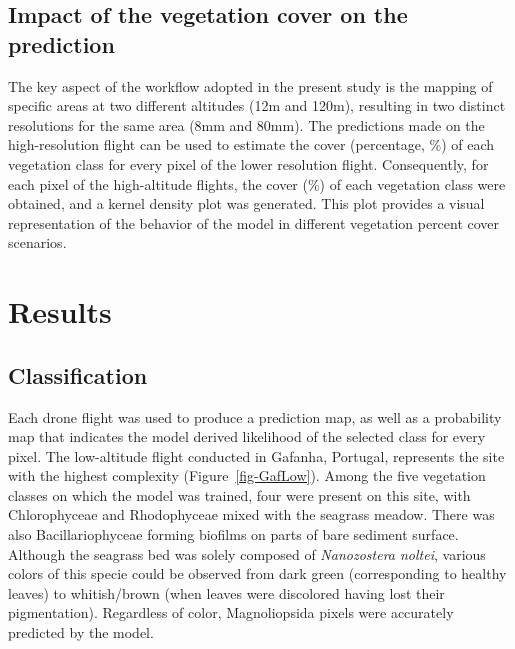 \documentclass[
  number]{elsarticle}
\begin{document}
\subsection{Impact of the vegetation cover on the
prediction}\label{impact-of-the-vegetation-cover-on-the-prediction}

The key aspect of the workflow adopted in the present study is the
mapping of specific areas at two different altitudes (12m and 120m),
resulting in two distinct resolutions for the same area (8mm and 80mm).
The predictions made on the high-resolution flight can be used to
estimate the cover (percentage, \%) of each vegetation class for every
pixel of the lower resolution flight. Consequently, for each pixel of
the high-altitude flights, the cover (\%) of each vegetation class were
obtained, and a kernel density plot was generated. This plot provides a
visual representation of the behavior of the model in different
vegetation percent cover scenarios.

\section{Results}\label{results}

\subsection{Classification}\label{classification}

Each drone flight was used to produce a prediction map, as well as a
probability map that indicates the model derived likelihood of the
selected class for every pixel. The low-altitude flight conducted in
Gafanha, Portugal, represents the site with the highest complexity
(Figure~\ref{fig-GafLow}). Among the five vegetation classes on which
the model was trained, four were present on this site, with
Chlorophyceae and Rhodophyceae mixed with the seagrass meadow. There was
also Bacillariophyceae forming biofilms on parts of bare sediment
surface. Although the seagrass bed was solely composed of
\emph{Nanozostera noltei}, various colors of this specie could be
observed from dark green (corresponding to healthy leaves) to
whitish/brown (when leaves were discolored having lost their
pigmentation). Regardless of color, Magnoliopsida pixels were accurately
predicted by the model.
\end{document}
